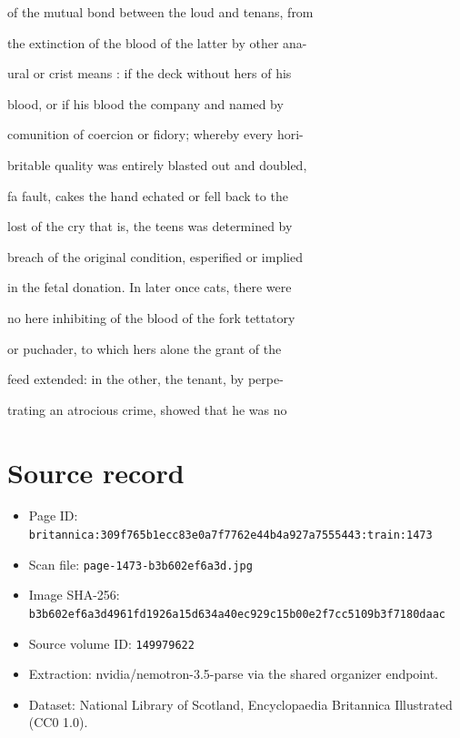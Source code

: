 \documentclass{article}
\begin{document}
of the mutual bond between the loud and tenans, from

the extinction of the blood of the latter by other ana-

ural or crist means : if the deck without hers of his

blood, or if his blood the company and named by

comunition of coercion or fidory; whereby every hori-

britable quality was entirely blasted out and doubled,

fa fault, cakes the hand echated or fell back to the

lost of the cry that is, the teens was determined by

breach of the original condition, esperified or implied

in the fetal donation. In later once cats, there were

no here inhibiting of the blood of the fork tettatory

or puchader, to which hers alone the grant of the

feed extended: in the other, the tenant, by perpe-

trating an atrocious crime, showed that he was no

\section*{Source record}
\begin{itemize}
\item Page ID: \texttt{britannica:309f765b1ecc83e0a7f7762e44b4a927a7555443:train:1473}
\item Scan file: \texttt{page-1473-b3b602ef6a3d.jpg}
\item Image SHA-256: \texttt{b3b602ef6a3d4961fd1926a15d634a40ec929c15b00e2f7cc5109b3f7180daac}
\item Source volume ID: \texttt{149979622}
\item Extraction: nvidia/nemotron-3.5-parse via the shared organizer endpoint.
\item Dataset: National Library of Scotland, Encyclopaedia Britannica Illustrated (CC0 1.0).
\end{itemize}
\end{document}

